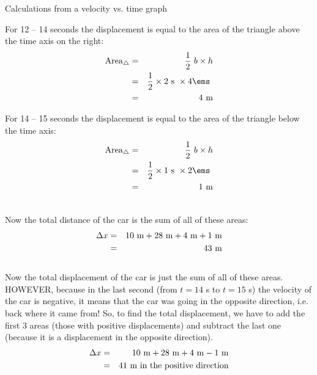\begin{wex}{Calculations from a velocity vs. time graph}
{\begin{minipage}{0.4\textwidth}
For 12 -- 14 seconds the displacement is equal to the area of the triangle above the time axis on the right:
\begin{eqnarray*}
\rm{Area}_{\triangle} &=& \frac{1}{2}~b \times h\\
&=& \frac{1}{2} \times 2\rm{~s}\ \times 4 \ems \ \\
&=&4\ \mathrm{m}\\
\end{eqnarray*}
\end{minipage}
\begin{minipage}{0.05\textwidth}
\begin{center}
\end{center}
\end{minipage}
\begin{minipage}{0.4\textwidth}
For 14 -- 15 seconds the displacement is equal to the area of the triangle below the time axis:
\begin{eqnarray*}
\rm{Area}_{\triangle} &=& \frac{1}{2}~b \times h\\
&=& \frac{1}{2} \times 1\rm{~s}\ \times 2 \ems\ \\
&=&1\ \mathrm{m}\\
\end{eqnarray*}
\end{minipage}
\\
Now the total distance of the car is the sum of all of these areas:
\begin{eqnarray*}
\Delta x&=&10\rm{~m} + 28\rm{~m} + 4\rm{~m} + 1\rm{~m}\\
&=&43\ \mathrm{m}
\end{eqnarray*}
\\
Now the total displacement of the car is just the sum of all of these areas. HOWEVER, because in the last second (from $t=14$ s to $t=15$ s) the velocity of the car is negative, it means that the car was going in the opposite direction, i.e. back where it came from! So, to find the total displacement, we have to add the first 3 areas (those with positive displacements) and subtract the last one (because it is a displacement in the opposite direction).
\begin{eqnarray*}
\Delta x&=&10\rm{~m} +28\rm{~m} +4\rm{~m} -1\rm{~m}\\
&=&41\ \mathrm{m}\ \mbox{in the positive direction}
\end{eqnarray*}}
\end{wex}


